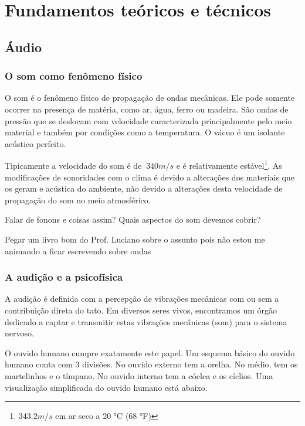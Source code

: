 \chapter{Fundamentos teóricos e técnicos} %
\label{cap:intro} %

\section{Áudio}

\subsection{O som como fenômeno físico}

O som é o fenômeno físico de propagação de ondas mecânicas. Ele pode
somente ocorrer na presença de matéria, como ar, água, ferro ou madeira.
São ondas de pressão que se deslocam com velocidade caracterizada principalmente
pelo meio material e também por condições como a temperatura. O vácuo é um isolante acústico perfeito.

Tipicamente a velocidade do som é de $~340 m/s $ e é
relativamente estável\footnote{$343.2 m/s$ em ar seco a 20 °C (68 °F)}.
As modificações de sonoridades com o clima é devido a alterações
dos materiais que os geram e acústica do ambiente, não devido a alterações
desta velocidade de propagação do som no meio atmosférico.

Falar de fonons e coisas assim? Quais aspectos do som devemos cobrir?

Pegar um livro bom do Prof. Luciano sobre o assunto pois não estou me animando a ficar
escrevendo sobre ondas

\subsection{A audição e a psicofísica}

A audição é definida com a percepção de vibrações mecânicas com
ou sem a contribuição direta do tato. Em diversos
seres vivos, encontramos um órgão dedicado a captar e transmitir
estas vibrações mecânicas (som) para o sistema nervoso.

O ouvido humano cumpre exatamente este papel. Um esquema básico
do ouvido humano conta com 3 divisões. No ouvido externo tem a orelha.
No médio, tem os martelinhos e o tímpano. No ouvido interno tem a cóclea
e os cíclios. Uma visualização simplificada do ouvido humano está abaixo.



